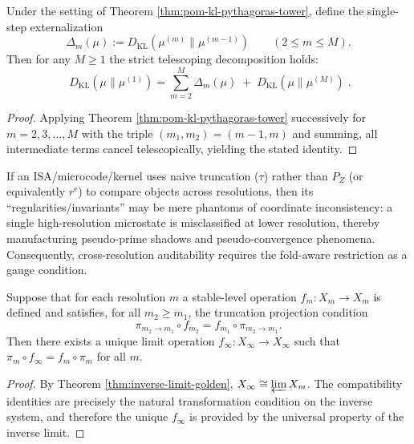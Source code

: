 \begin{corollary}\label{cor:pom-kl-ledger-telescope}
Under the setting of Theorem \ref{thm:pom-kl-pythagoras-tower}, define the single-step externalization
\[
\Delta_m(\mu):=D_{\mathrm{KL}}(\mu^{(m)}\|\mu^{(m-1)})\qquad(2\le m\le M).
\]
Then for any $M\ge 1$ the strict telescoping decomposition holds:
\[
\boxed{\;
D_{\mathrm{KL}}(\mu\|\mu^{(1)})
=\sum_{m=2}^{M}\Delta_m(\mu)\;+\;D_{\mathrm{KL}}(\mu\|\mu^{(M)})\; }.
\]
\end{corollary}
\begin{proof}
Applying Theorem \ref{thm:pom-kl-pythagoras-tower} successively for $m=2,3,\dots,M$ with the triple $(m_1,m_2)=(m-1,m)$ and summing, all intermediate terms cancel telescopically, yielding the stated identity.
\end{proof}

\begin{remark}\label{rem:pom-gauge-criterion}
If an ISA/microcode/kernel uses naive truncation ($\tau$) rather than $P_Z$ (or equivalently $r^{\mathrm{e}}$) to compare objects across resolutions, then its ``regularities/invariants'' may be mere phantoms of coordinate inconsistency: a single high-resolution microstate is misclassified at lower resolution, thereby manufacturing pseudo-prime shadows and pseudo-convergence phenomena. Consequently, cross-resolution auditability requires the fold-aware restriction as a gauge condition.
\end{remark}

\begin{theorem}\label{thm:pom-inverse-limit}
Suppose that for each resolution $m$ a stable-level operation $f_m:X_m\to X_m$ is defined and satisfies, for all $m_2\ge m_1$, the truncation projection condition
\[
\pi_{m_2\to m_1}\circ f_{m_2}=f_{m_1}\circ \pi_{m_2\to m_1}.
\]
Then there exists a unique limit operation $f_\infty:X_\infty\to X_\infty$ such that $\pi_m\circ f_\infty=f_m\circ \pi_m$ for all $m$.
\end{theorem}
\begin{proof}
By Theorem \ref{thm:inverse-limit-golden}, $X_\infty\cong\varprojlim X_m$. The compatibility identities are precisely the natural transformation condition on the inverse system, and therefore the unique $f_\infty$ is provided by the universal property of the inverse limit.
\end{proof}


